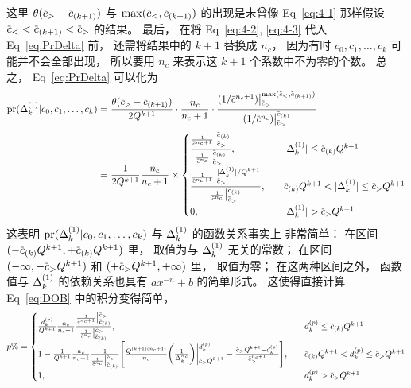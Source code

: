 这里 $\theta(\dmscbar_>-\dmscbar_{(k+1)})$ 与
$\max(\dmscbar_<,\dmscbar_{(k+1)})$ 的出现是未曾像 Eq~\eqref{eq:4-1} 那样假设
$\dmscbar_< <\dmscbar_{(k+1)}<\dmscbar_>$ 的结果。
最后，
在将 Eq~\eqref{eq:4-2}, \eqref{eq:4-3} 代入 Eq~\eqref{eq:PrDelta} 前，
还需将结果中的 $k+1$ 替换成 $n_c$，
因为有时 $c_0,c_1,\ldots,c_k$ 可能并不会全部出现，
所以要用 $n_c$ 来表示这 $k+1$ 个系数中不为零的个数。
总之，
Eq~\eqref{eq:PrDelta} 可以化为
\begin{equation}
  \label{eq:PrDeltaSetA}
  \begin{aligned}
    \dmspr(\dmsdeltako|\dmsccck) &=
    \frac{\theta(\dmscbar_>-\dmscbar_{(k+1)})}{2Q^{k+1}}\cdot
    \frac{n_c}{n_c+1}\cdot\frac{(1/\dmscbar^{n_c+1})\dmsvat{\dmscbar_>}{
        \max(\dmscbar_<,\dmscbar_{(k+1)})}}{(1/\dmscbar^{n_c})\dmsvat{
        \dmscbar_>}{\dmscbar_{(k)}}} \\
    &= \frac{1}{2Q^{k+1}} \frac{n_c}{n_c+1} \times
    \begin{cases}
      \frac{\frac{1}{\dmscbar^{n_c+1}}
        \dmsvat{\dmscbar_>}{\dmscbar_{(k)}}}{
        \frac{1}{\dmscbar^{n_c}}
        \dmsvat{\dmscbar_>}{\dmscbar_{(k)}}},
      &\quad |\dmsdeltako|\le\dmscbar_{(k)}Q^{k+1} \\
      \frac{\frac{1}{\dmscbar^{n_c+1}}
        \dmsvat{\dmscbar_>}{|\dmsdeltako|/Q^{k+1}}}{
        \frac{1}{\dmscbar^{n_c}}
        \dmsvat{\dmscbar_>}{\dmscbar_{(k)}}},
      &\quad \dmscbar_{(k)}Q^{k+1}<|\dmsdeltako|\le\dmscbar_>Q^{k+1} \\
      0, &\quad |\dmsdeltako|>\dmscbar_>Q^{k+1}
    \end{cases}
  \end{aligned}
\end{equation}
这表明 $\textrm{pr}(\Delta_k^{(1)}|c_0,c_1,\ldots,c_k)$ 与 $\Delta_k^{(1)}$ 的函数关系事实上
非常简单：
在区间 $(-\dmscbar_{(k)}Q^{k+1},+\dmscbar_{(k)}Q^{k+1})$ 里，
取值为与 $\Delta_k^{(1)}$ 无关的常数；
在区间 $(-\infty,-\dmscbar_>Q^{k+1})$ 和 $(+\dmscbar_>Q^{k+1},+\infty)$ 里，
取值为零；
在这两种区间之外，
函数值与 $\Delta_k^{(1)}$ 的依赖关系也具有 $ax^{-n}+b$ 的简单形式。
这使得直接计算 Eq~\eqref{eq:DOB} 中的积分变得简单，
\begin{equation}
  \label{eq:DOBSetA}
  p\%=
  \begin{cases}
    \frac{\dmsdkp}{Q^{k+1}} \frac{n_c}{n_c+1}
    \frac{ \frac{1}{\dmscbar^{n_c+1}}\dmsvat{\dmscbar_{(k)}}{\dmscbar_>}}{
      \frac{1}{\dmscbar^{n_c}}\dmsvat{\dmscbar_{(k)}}{\dmscbar_>}},
    &\quad \dmsdkp\le\dmscbar_{(k)}Q^{k+1} \\
    1 - \frac{1}{Q^{k+1}} \frac{n_c}{n_c+1}
    \frac{1}{\frac{1}{\dmscbar^{n_c}}\dmsvat{\dmscbar_{(k)}}{\dmscbar_>}}
    \Biggl[ \frac{Q^{(k+1)(n_c+1)}}{n_c}\biggl( \frac{1}{\Delta_k^{n_c}}
      \biggr)\dmsvat[\bigg]{\dmscbar_>Q^{k+1}}{\dmsdkp}-
      \frac{\dmscbar_>Q^{k+1}-\dmsdkp}{\dmscbar_>^{n_c+1}}\Biggr],
    &\quad \dmscbar_{(k)}Q^{k+1} < \dmsdkp \le \dmscbar_>Q^{k+1} \\
    1, &\quad \dmsdkp > \dmscbar_>Q^{k+1}
  \end{cases}
\end{equation}
